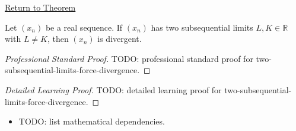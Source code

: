 \newpage
{}
\label{prf:two-subsequential-limits-force-divergence}

\begin{remark*}[Return]
\hyperref[thm:two-subsequential-limits-force-divergence]{Return to Theorem}
\end{remark*}

\begin{theorem*}
Let $(x_n)$ be a real sequence. If $(x_n)$ has two subsequential limits
$L,K\in\mathbb{R}$ with $L\ne K$, then $(x_n)$ is divergent.

\smallskip
\noindent
\end{theorem*}

\begin{proof}[Professional Standard Proof]
\LRAProofBodyStart
TODO: professional standard proof for two-subsequential-limits-force-divergence.
\end{proof}

\begin{proof}[Detailed Learning Proof]
\LRAProofBodyStart
TODO: detailed learning proof for two-subsequential-limits-force-divergence.
\end{proof}

\begin{remark*}
\end{remark*}

\begin{dependencies}
\begin{itemize}
  \item TODO: list mathematical dependencies.
\end{itemize}
\end{dependencies}

\clearpage
